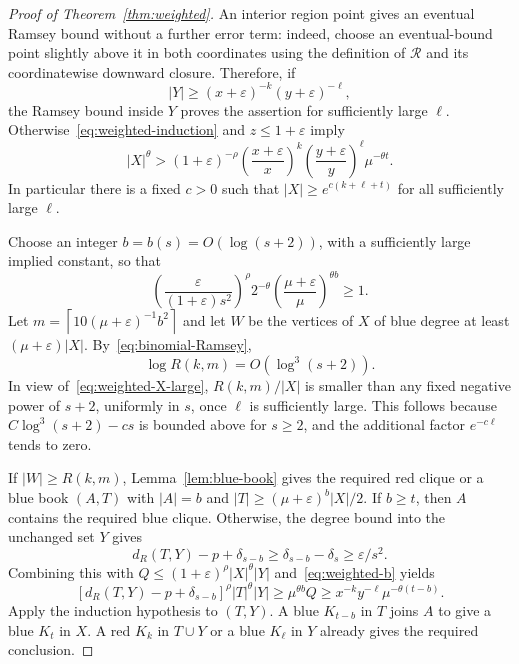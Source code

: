 \documentclass[11pt]{article}
\theoremstyle{definition}
\theoremstyle{remark}
\newcommand{\RR}{\mathcal R}
\newcommand{\ceil}[1]{\left\lceil #1\right\rceil}
\numberwithin{equation}{section}
\begin{document}
\begin{proof}[Proof of Theorem~\ref{thm:weighted}]
An interior region point gives an eventual Ramsey bound without a further error term: indeed, choose an eventual-bound point slightly above it in both coordinates using the definition of $\RR$ and its coordinatewise downward closure. Therefore, if
\[
 |Y|\ge(x+\varepsilon)^{-k}(y+\varepsilon)^{-\ell},
\]
the Ramsey bound inside $Y$ proves the assertion for sufficiently large
$\ell$. Otherwise~\eqref{eq:weighted-induction} and $z\le1+\varepsilon$ imply
\begin{equation}\label{eq:weighted-X-large}
 |X|^\theta>
 (1+\varepsilon)^{-\rho}
 \left(\frac{x+\varepsilon}{x}\right)^k
 \left(\frac{y+\varepsilon}{y}\right)^\ell
 \mu^{-\theta t}.
\end{equation}
In particular there is a fixed $c>0$ such that $|X|\ge e^{c(k+\ell+t)}$ for all sufficiently large $\ell$.

Choose an integer $b=b(s)=O(\log(s+2))$, with a sufficiently large implied constant, so that
\begin{equation}\label{eq:weighted-b}
 \left(\frac{\varepsilon}{(1+\varepsilon)s^2}\right)^\rho
 2^{-\theta}\left(\frac{\mu+\varepsilon}{\mu}\right)^{\theta b}\ge1.
\end{equation}
Let $m=\ceil{10(\mu+\varepsilon)^{-1}b^2}$ and let $W$ be the vertices of $X$ of blue degree at least $(\mu+\varepsilon)|X|$. By~\eqref{eq:binomial-Ramsey},
\[
 \log R(k,m)=O(\log^3(s+2)).
\]
In view of~\eqref{eq:weighted-X-large}, $R(k,m)/|X|$ is smaller than any fixed negative power of $s+2$, uniformly in $s$, once $\ell$ is sufficiently large. This follows because $C\log^3(s+2)-cs$ is bounded above for $s\ge2$, and the additional factor $e^{-c\ell}$ tends to zero.

If $|W|\ge R(k,m)$, Lemma~\ref{lem:blue-book} gives the required red clique or a blue book $(A,T)$ with $|A|=b$ and $|T|\ge(\mu+\varepsilon)^b|X|/2$. If $b\ge t$, then $A$ contains the required blue clique. Otherwise, the degree bound into the unchanged set $Y$ gives
\[
 d_R(T,Y)-p+\delta_{s-b}\ge\delta_{s-b}-\delta_s\ge\varepsilon/s^2.
\]
Combining this with $Q\le(1+\varepsilon)^\rho|X|^\theta|Y|$ and~\eqref{eq:weighted-b} yields
\[
 [d_R(T,Y)-p+\delta_{s-b}]^\rho|T|^\theta|Y|
 \ge\mu^{\theta b}Q
 \ge x^{-k}y^{-\ell}\mu^{-\theta(t-b)}.
\]
Apply the induction hypothesis to $(T,Y)$. A blue $K_{t-b}$ in $T$
joins $A$ to give a blue $K_t$ in $X$. A red $K_k$ in $T\cup Y$
or a blue $K_\ell$ in $Y$ already gives the required conclusion.


\end{proof}
\end{document}
